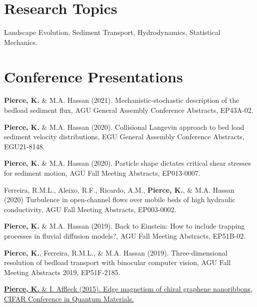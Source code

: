 \documentclass[11pt,letterpaper]{article}
\renewenvironment{itemize}{
	\begin{list}{}{
			\setlength{\leftmargin}{1.5em}
			\setlength{\rightmargin}{0em}  %
			\setlength{\itemsep}{0.25em}
			\setlength{\parskip}{0pt}
			\setlength{\parsep}{0.25em}
		}
	}{
	\end{list}
}
\renewenvironment{itemize}{
	\begin{list}{}{
			\setlength{\leftmargin}{1.5em}
			\setlength{\itemsep}{0.25em}
			\setlength{\parskip}{0pt}
			\setlength{\parsep}{0.25em}
		}
	}{
	\end{list}
}
\begin{document}
	\section*{Research Topics}
	
	Landscape Evolution, Sediment Transport, Hydrodynamics, Statistical Mechanics.



\section*{Conference Presentations}

	\begin{itemize}
		\item \textbf{Pierce, K.} \& M.A. Hassan (2021). Mechanistic-stochastic description of the bedload sediment flux, AGU General Assembly Conference Abstracts, EP43A-02.
		
		\item \textbf{Pierce, K.} \& M.A. Hassan (2020). Collisional Langevin approach to bed load sediment velocity distributions, EGU General Assembly Conference Abstracts, EGU21-8148.
		
		\item \textbf{Pierce, K.} \& M.A. Hassan (2020). Particle shape dictates critical shear stresses for sediment motion, AGU Fall Meeting Abstracts, EP013-0007.
		
		\item Ferreira, R.M.L., Aleixo, R.F., Ricardo, A.M., \textbf{Pierce, K.}, \& M.A. Hassan (2020) Turbulence in open-channel flows over mobile beds of high hydraulic conductivity, AGU Fall Meeting Abstracts, EP003-0002.
		
		\item \textbf{Pierce, K.} \& M.A. Hassan (2019). Back to Einstein: How to include trapping processes in fluvial diffusion models?, AGU Fall Meeting Abstracts, EP51B-02.
		
		\item \textbf{Pierce, K.}, Ferreira, R.M.L., \& M.A. Hassan (2019). Three-dimensional resolution of bedload transport with binocular computer vision, AGU Fall Meeting Abstracts 2019, EP51F-2185.
		
		\item \href{https://www.osapublishing.org/ol/abstract.cfm?uri=ol-37-5-788}{\textbf{Pierce, K.} \& I. Affleck (2015). Edge magnetism of chiral graphene nanoribbons, CIFAR Conference in Quantum Materials.}
	\end{itemize}
\end{document}
